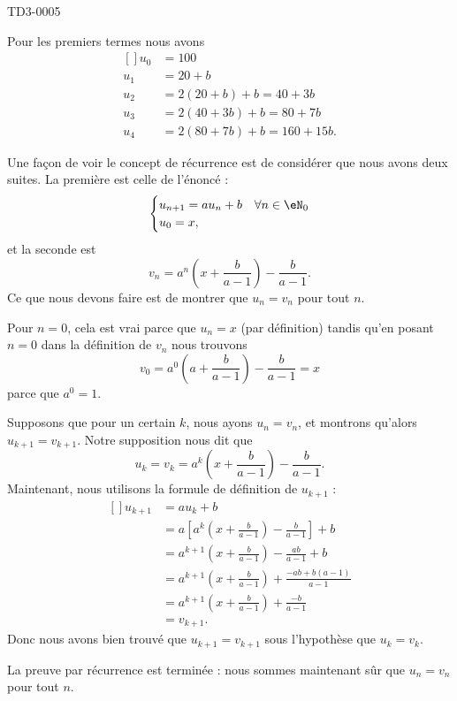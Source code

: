 
\begin{corrige}{TD3-0005}

	Pour les premiers termes nous avons
	\begin{equation}
		\begin{aligned}[]
			u_0&=100\\
			u_1&=20+b\\
			u_2&=2(20+b)+b=40+3b\\
			u_3&=2(40+3b)+b=80+7b\\
			u_4&=2(80+7b)+b=160+15b.
		\end{aligned}
	\end{equation}
	
	Une façon de voir le concept de récurrence est de considérer que nous avons deux suites. La première est celle de l'énoncé :
	\begin{equation}
		\begin{cases}
			u_{n+1}=au_n+b	&	\text{}\forall n\in\eN_0\\
			u_0=x,
		\end{cases}
	\end{equation}
	et la seconde est 
	\begin{equation}
		v_n=a^n\left( x+\frac{ b }{ a-1 } \right)-\frac{ b }{ a-1 }.
	\end{equation}
	Ce que nous devons faire est de montrer que $u_n=v_n$ pour tout $n$.

	Pour $n=0$, cela est vrai parce que $u_n=x$ (par définition) tandis qu'en posant $n=0$ dans la définition de $v_n$ nous trouvons 
	\begin{equation}
		v_0=a^0\left( a+\frac{ b }{ a-1 } \right)-\frac{ b }{ a-1 }=x
	\end{equation}
	parce que $a^0=1$.

	Supposons que pour un certain $k$, nous ayons $u_n=v_n$, et montrons qu'alors $u_{k+1}=v_{k+1}$. Notre supposition nous dit que
	\begin{equation}
		u_k=v_k=a^k\left( x+\frac{ b }{ a-1 } \right)-\frac{ b }{ a-1 }.
	\end{equation}
	Maintenant, nous utilisons la formule de définition de $u_{k+1}$ :
	\begin{equation}
		\begin{aligned}[]
			u_{k+1}&=au_k+b\\
			&=a\left[ a^k\left( x+\frac{ b }{ a-1 } \right)-\frac{ b }{ a-1 } \right]+b\\
			&=a^{k+1}\left( x+\frac{ b }{ a-1 } \right)-\frac{ ab }{ a-1 }+b\\
			&=a^{k+1}\left( x+\frac{ b }{ a-1 } \right)+\frac{ -ab+b(a-1) }{ a-1 }\\
			&=a^{k+1}\left( x+\frac{ b }{ a-1 } \right)+\frac{ -b }{ a-1 }\\
			&=v_{k+1}.
		\end{aligned}
	\end{equation}
	Donc nous avons bien trouvé que $u_{k+1}=v_{k+1}$ sous l'hypothèse que $u_k=v_k$. 

	La preuve par récurrence est terminée : nous sommes maintenant sûr que $u_n=v_n$ pour tout $n$.
\end{corrige}
